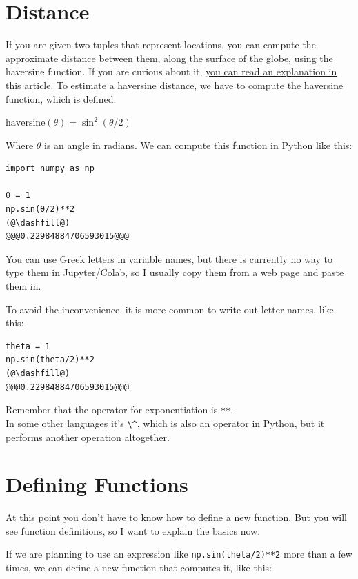 \hypertarget{distance}{%
\section{Distance}\label{distance}}

If you are given two tuples that represent locations, you can compute
the approximate distance between them, along the surface of the globe,
using the haversine function. If you are curious about it,
\href{https://janakiev.com/blog/gps-points-distance-python/}{you can
read an explanation in this article}. To estimate a haversine distance,
we have to compute the haversine function, which is defined:

\(\mathrm{haversine}(\theta)=\sin^2(\theta/2)\)

Where \(\theta\) is an angle in radians. We can compute this function in
Python like this:

\begin{lstlisting}[]
import numpy as np

θ = 1
np.sin(θ/2)**2
(@\dashfill@)
@@@0.22984884706593015@@@
\end{lstlisting}

You can use Greek letters in variable names, but there is currently no
way to type them in Jupyter/Colab, so I usually copy them from a web
page and paste them in.

To avoid the inconvenience, it is more common to write out letter names,
like this:

\begin{lstlisting}[]
theta = 1
np.sin(theta/2)**2
(@\dashfill@)
@@@0.22984884706593015@@@
\end{lstlisting}

Remember that the operator for exponentiation is
\passthrough{\lstinline!**!}.\\
In some other languages it's \passthrough{\lstinline!\^!}, which is also
an operator in Python, but it performs another operation altogether.

\hypertarget{defining-functions}{%
\section{Defining Functions}\label{defining-functions}}

At this point you don't have to know how to define a new function. But
you will see function definitions, so I want to explain the basics now.

If we are planning to use an expression like
\passthrough{\lstinline!np.sin(theta/2)**2!} more than a few times, we
can define a new function that computes it, like this:

